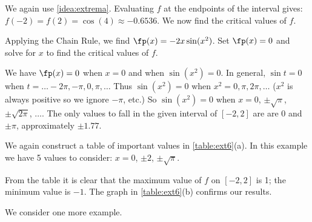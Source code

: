 {%
%
We again use \autoref{idea:extrema}. Evaluating $f$ at the endpoints of the interval gives: $f(-2) = f(2) = \cos (4) \approx -0.6536.$ We now find the critical values of $f$.

Applying the Chain Rule, we find $\fp(x) = -2x\sin (x^2)$. Set $\fp(x) = 0$ and solve for $x$ to find the critical values of $f$. 

We have $\fp(x) = 0$ when $x = 0$ and when $\sin (x^2) = 0$. In general, $\sin t = 0$ when $t = \ldots -2\pi, -\pi, 0, \pi, \ldots$ Thus $\sin (x^2) = 0$ when $x^2 = 0, \pi, 2\pi, \ldots$ ($x^2$ is always positive so we ignore $-\pi$, etc.) So $\sin (x^2)=0$ when $x= 0$, $\pm \sqrt{\pi}$, $\pm\sqrt{2\pi}$, $\dotsc$. The only values to fall in the given interval of $[-2,2]$ are are $0$ and $\pm\pi$, approximately $\pm 1.77$.

We again construct a table of important values in \autoref{table:ext6}(a). In this example we have 5 values to consider: $x= 0$, $\pm 2$, $\pm\sqrt{\pi}$. 

From the table it is clear that the maximum value of $f$ on $[-2,2]$ is 1; the minimum value is $-1$. The graph in \autoref{table:ext6}(b) confirms our results.}

We consider one more example.


